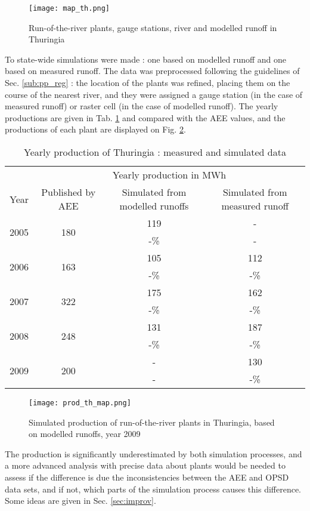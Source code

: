 \begin{figure}[H]
\centering
\texttt{[image: map\_th.png]}
\caption{Run-of-the-river plants, gauge stations, river and modelled runoff in Thuringia}
\label{map_th}
\end{figure}

To state-wide simulations were made : one based on modelled runoff and one based on measured runoff. The data was preprocessed following the guidelines of Sec. \ref{sub:pp_reg} : the location of the plants was refined, placing them on the course of the nearest river, and they were assigned a gauge station (in the case of measured runoff) or raster cell (in the case of modelled runoff). The yearly productions are given in Tab. \ref{res_th} and compared with the AEE values, and the productions of each plant are displayed on Fig. \ref{prod_th_map}.

\begin{table}[H]
\footnotesize
 \centering
 \caption{Yearly production of Thuringia : measured and simulated data}
 \label{res_th}
 \begin{tabular}{|l|ccc|}
 \hline
  &\multicolumn{3}{c|}{Yearly production in MWh}\\
  Year&Published by AEE&Simulated from modelled runoffs&Simulated from measured runoff\\
  \hline \hline
  \multirow{2}{*}{2005}&\multirow{2}{*}{180}&119&-\\
  &&-\unit[34]{\%}&-\\
  \hline
  \multirow{2}{*}{2006}&\multirow{2}{*}{163}&105&112\\
  &&-\unit[36]{\%}&-\unit[31]{\%}\\
  \hline
  \multirow{2}{*}{2007}&\multirow{2}{*}{322}&175&162\\
  &&-\unit[46]{\%}&-\unit[50]{\%}\\
  \hline
  \multirow{2}{*}{2008}&\multirow{2}{*}{248}&131&187\\
  &&-\unit[47]{\%}&-\unit[25]{\%}\\
  \hline
  \multirow{2}{*}{2009}&\multirow{2}{*}{200}&-&130\\
  &&-&-\unit[35]{\%}\\
  \hline
 \end{tabular}
\end{table}

\begin{figure}[H]
\centering
\texttt{[image: prod\_th\_map.png]}
\caption{Simulated production of run-of-the-river plants in Thuringia, based on modelled runoffs, year 2009}
\label{prod_th_map}
\end{figure}
 
The production is significantly underestimated by both simulation processes, and a more advanced analysis with precise data about plants would be needed to assess if the difference is due the inconsistencies between the AEE and OPSD data sets, and if not, which parts of the simulation process causes this difference. Some ideas are given in Sec. \ref{sec:improv}.